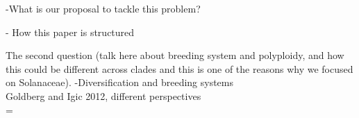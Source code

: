 -What is our proposal to tackle this problem?\newline

- How this paper is structured \newline

The second question (talk here about breeding system and polyploidy, and how this could be different across clades and this is one of the reasons why we focused on Solanaceae).
-Diversification and breeding systems\\
Goldberg and Igic 2012, different  perspectives\\



=
